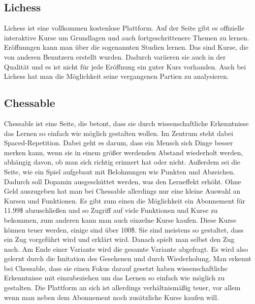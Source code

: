 \subsection{Lichess}
Lichess ist eine vollkommen kostenlose Plattform. Auf der Seite gibt es offizielle interaktive Kurse um Grundlagen und auch fortgeschrittenere Themen zu lernen. Eröffnungen kann man über die sogenannten Studien lernen. Das sind Kurse, die von anderen Benutzern erstellt wurden. Dadurch variieren sie auch in der Qualität und es ist nicht für jede Eröffnung ein guter Kurs vorhanden. Auch bei Lichess hat man die Möglichkeit seine vergangenen Partien zu analysieren.

\subsection{Chessable}
Chessable ist eine Seite, die betont, dass sie durch wissenschaftliche Erkenntnisse das Lernen so einfach wie möglich gestalten wollen. \cite{prof_barry_hymer_science_nodate} Im Zentrum steht dabei Spaced-Repetition. Dabei geht es darum, dass ein Mensch sich Dinge besser merken kann, wenn sie in einem größer werdenden Abstand wiederholt werden, abhängig davon, ob man sich richtig erinnert hat oder nicht. Außerdem sei die Seite, wie ein Spiel aufgebaut mit Belohnungen wie Punkten und Abzeichen. Dadurch soll Dopamin ausgeschüttet werden, was den Lerneffekt erhöht. Ohne Geld auszugeben hat man bei Chessable allerdings nur eine kleine Auswahl an Kursen und Funktionen. Es gibt zum einen die Möglichkeit ein Abonnement für 11.99\$ abzuschließen und so Zugriff auf viele Funktionen und Kurse zu bekommen, zum anderen kann man auch einzelne Kurse kaufen. Diese Kurse können teuer werden, einige sind über 100\$. Sie sind meistens so gestaltet, dass ein Zug vorgeführt wird und erklärt wird. Danach spielt man selbst den Zug nach. Am Ende einer Variante wird die gesamte Variante abgefragt. Es wird also gelernt durch die Imitation des Gesehenen und durch Wiederholung. Man erkennt bei Chessable, dass sie einen Fokus darauf gesetzt haben wissenschaftliche Erkenntnisse mit einzubeziehen um das Lernen so einfach wie möglich zu gestalten. Die Plattform an sich ist allerdings verhältnismäßig teuer, vor allem wenn man neben dem Abonnement noch zusätzliche Kurse kaufen will.

